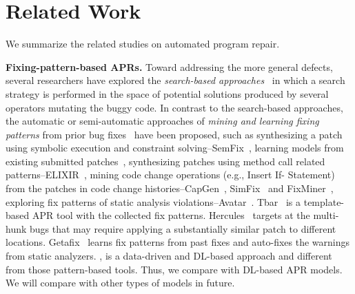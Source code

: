 \section{Related Work}
We summarize the related studies on automated program repair.

{\bf Fixing-pattern-based APRs.} 
%
Toward addressing the more general
defects, several researchers have explored the {\em search-based
	approaches}~\cite{le2011genprog,qi2014strength,LeGoues-icse12,martinez2016astor}
in which a search strategy is performed in the space of potential
solutions produced by several operators mutating the buggy
code. %
%
In contrast to the search-based approaches, the automatic or
semi-automatic approaches of {\em mining and learning fixing patterns}
from prior bug fixes~\cite{le2016history,
  kim2013automatic,nguyen2013semfix,liu2019avatar,tbar-issta19} have
been proposed, such as synthesizing a patch using symbolic execution
and constraint solving--SemFix~\cite{nguyen2013semfix}, learning
models from existing submitted
patches~\cite{long2016automatic,long2017automatic,le2016history},
synthesizing patches using method call related
patterns--ELIXIR~\cite{saha2017elixir}, mining code change operations
(e.g., Insert If- Statement) from the patches in code change
histories--CapGen~\cite{wen2018context},
SimFix~\cite{Simfix} and
FixMiner~\cite{koyuncu2018fixminer}, exploring fix patterns of static
analysis
violations--Avatar~\cite{liu2019avatar}. Tbar~\cite{tbar-issta19} is a
template-based APR tool with the collected fix patterns.
Hercules~\cite{10.1109/ICSE.2019.00020} targets at the multi-hunk bugs that
may require applying a substantially similar patch to different
locations.  Getafix~\cite{bader2019getafix} learns fix patterns from
past fixes and auto-fixes the warnings from static analyzers. {\tool},
is a data-driven and DL-based approach and different from
those pattern-based tools. Thus, we compare {\tool} with DL-based
APR models. We will compare with other types of models in future.




